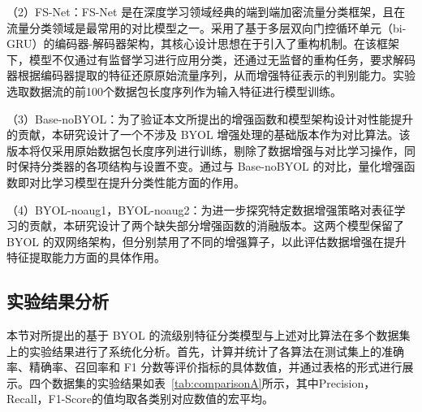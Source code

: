 （2）FS-Net\cite{liu2019fs}：FS-Net 是在深度学习领域经典的端到端加密流量分类框架，且在流量分类领域是最常用的对比模型之一。采用了基于多层双向门控循环单元（bi-GRU）的编码器-解码器架构，其核心设计思想在于引入了重构机制。在该框架下，模型不仅通过有监督学习进行应用分类，还通过无监督的重构任务，要求解码器根据编码器提取的特征还原原始流量序列，从而增强特征表示的判别能力。实验选取数据流的前100个数据包长度序列作为输入特征进行模型训练。

（3）Base-noBYOL：为了验证本文所提出的增强函数和模型架构设计对性能提升的贡献，本研究设计了一个不涉及 BYOL 增强处理的基础版本作为对比算法。该版本将仅采用原始数据包长度序列进行训练，剔除了数据增强与对比学习操作，同时保持分类器的各项结构与设置不变。通过与 Base-noBYOL 的对比，量化增强函数即对比学习模型在提升分类性能方面的作用。

（4）BYOL-noaug1，BYOL-noaug2：为进一步探究特定数据增强策略对表征学习的贡献，本研究设计了两个缺失部分增强函数的消融版本。这两个模型保留了 BYOL 的双网络架构，但分别禁用了不同的增强算子，以此评估数据增强在提升特征提取能力方面的具体作用。

\subsection{实验结果分析}
本节对所提出的基于 BYOL 的流级别特征分类模型与上述对比算法在多个数据集上的实验结果进行了系统化分析。首先，计算并统计了各算法在测试集上的准确率、精确率、召回率和 F1 分数等评价指标的具体数值，并通过表格的形式进行展示。四个数据集的实验结果如表~\ref{tab:comparisonA}所示，其中Precision，Recall，F1-Score的值均取各类别对应数值的宏平均。


